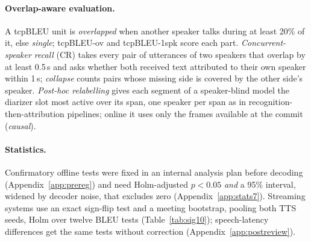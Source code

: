 \paragraph{Overlap-aware evaluation.}
\label{sec:eval-overlap}
A tcpBLEU unit is \emph{overlapped} when another speaker talks during at least 20\% of it, else \emph{single};
tcpBLEU-ov and tcpBLEU-1spk score each part. \emph{Concurrent-speaker recall} (CR) takes every pair of utterances of two
speakers that overlap by at least 0.5\,s and asks whether both received text attributed to their own speaker within
1\,s; \emph{collapse} counts pairs whose missing side is covered by the other side's speaker. \emph{Post-hoc relabelling}
gives each segment of a speaker-blind model the diarizer slot most active over its span, one speaker per span as in
recognition-then-attribution pipelines; online it uses only the frames available at the commit (\emph{causal}).

\paragraph{Statistics.} Confirmatory offline tests were fixed in an internal analysis plan before decoding (Appendix~\ref{app:prereg}) and need Holm-adjusted $p<0.05$ \emph{and} a 95\% interval, widened by decoder
noise, that excludes zero (Appendix~\ref{app:stats7}). Streaming systems use an exact sign-flip test and a meeting bootstrap, pooling both TTS seeds, Holm over twelve
BLEU tests (Table~\ref{tab:sig10}); speech-latency differences get the same tests without
correction (Appendix~\ref{app:postreview}).
